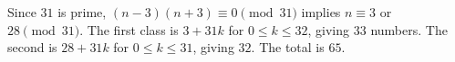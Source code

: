 Since $31$ is prime, $(n-3)(n+3)\equiv0\pmod{31}$ implies $n\equiv3$ or $28\pmod{31}$. The first class is $3+31k$ for $0\le k\le32$, giving $33$ numbers. The second is $28+31k$ for $0\le k\le31$, giving $32$. The total is $\boxed{65}$.
